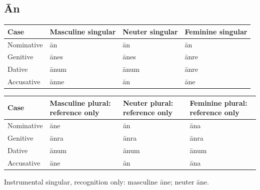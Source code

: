 \subsection*{Ān}

\par\begingroup
\fontsize{10.5}{13.2}\selectfont
\setlength{\LTleft}{0pt}\setlength{\LTright}{\fill}
\noindent
\begin{tabular}{@{}>{\raggedright\arraybackslash}p{22.0mm}>{\raggedright\arraybackslash}p{31.188mm}>{\raggedright\arraybackslash}p{31.188mm}>{\raggedright\arraybackslash}p{31.188mm}@{}}
\toprule
\textbf{Case} & \textbf{Masculine singular} & \textbf{Neuter singular} & \textbf{Feminine singular} \\
\midrule
Nominative & ān & ān & ān \\
Genitive & ānes & ānes & ānre \\
Dative & ānum & ānum & ānre \\
Accusative & ānne & ān & āne \\
\bottomrule
\end{tabular}
\par\endgroup
\par\addvspace{5pt}
\par\begingroup
\fontsize{10.5}{13.2}\selectfont
\setlength{\LTleft}{0pt}\setlength{\LTright}{\fill}
\noindent
\begin{tabular}{@{}>{\raggedright\arraybackslash}p{22.0mm}>{\raggedright\arraybackslash}p{31.188mm}>{\raggedright\arraybackslash}p{31.188mm}>{\raggedright\arraybackslash}p{31.188mm}@{}}
\toprule
\textbf{Case} & \textbf{Masculine plural: reference only} & \textbf{Neuter plural: reference only} & \textbf{Feminine plural: reference only} \\
\midrule
Nominative & āne & ān & āna \\
Genitive & ānra & ānra & ānra \\
Dative & ānum & ānum & ānum \\
Accusative & āne & ān & āna \\
\bottomrule
\end{tabular}
\par\endgroup
Instrumental singular, recognition only: masculine āne; neuter āne.

